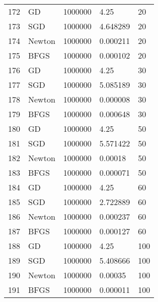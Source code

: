 \begin{tabular}{lllll}
172 &      GD &  1000000 &       4.25 &     20 \\
173 &     SGD &  1000000 &   4.648289 &     20 \\
174 &  Newton &  1000000 &   0.000211 &     20 \\
175 &    BFGS &  1000000 &   0.000102 &     20 \\
176 &      GD &  1000000 &       4.25 &     30 \\
177 &     SGD &  1000000 &   5.085189 &     30 \\
178 &  Newton &  1000000 &   0.000008 &     30 \\
179 &    BFGS &  1000000 &   0.000648 &     30 \\
180 &      GD &  1000000 &       4.25 &     50 \\
181 &     SGD &  1000000 &   5.571422 &     50 \\
182 &  Newton &  1000000 &    0.00018 &     50 \\
183 &    BFGS &  1000000 &   0.000071 &     50 \\
184 &      GD &  1000000 &       4.25 &     60 \\
185 &     SGD &  1000000 &   2.722889 &     60 \\
186 &  Newton &  1000000 &   0.000237 &     60 \\
187 &    BFGS &  1000000 &   0.000127 &     60 \\
188 &      GD &  1000000 &       4.25 &    100 \\
189 &     SGD &  1000000 &   5.408666 &    100 \\
190 &  Newton &  1000000 &    0.00035 &    100 \\
191 &    BFGS &  1000000 &   0.000011 &    100 \\
\bottomrule
\end{tabular}

